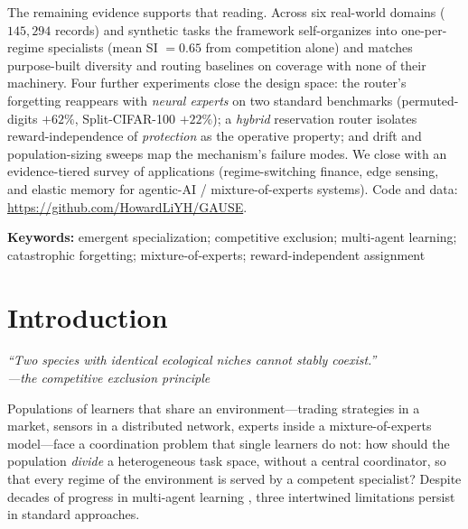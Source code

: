 \documentclass[10pt]{article}
\begin{document}
\begin{abstractbox}
The remaining evidence supports that reading. Across six real-world domains
($145{,}294$ records) and synthetic tasks the framework self-organizes into
one-per-regime specialists (mean SI $=0.65$ from competition alone) and matches
purpose-built diversity and routing baselines on coverage with none of their
machinery. Four further experiments close the design space: the router's forgetting
reappears with \emph{neural experts} on two standard benchmarks (permuted-digits
$+62\%$, Split-CIFAR-100 $+22\%$); a \emph{hybrid} reservation router isolates
reward-independence of \emph{protection} as the operative property; and drift and
population-sizing sweeps map the mechanism's failure modes. We close with an
evidence-tiered survey of applications (regime-switching finance, edge sensing, and
elastic memory for agentic-AI / mixture-of-experts systems).
Code and data: \url{https://github.com/HowardLiYH/GAUSE}.
\end{abstractbox}

\vspace{0.25cm}
\noindent\textbf{Keywords:} emergent specialization; competitive exclusion;
multi-agent learning; catastrophic forgetting; mixture-of-experts;
reward-independent assignment

\newpage
\tableofcontents
\newpage

\section{Introduction}

\begin{center}
\itshape``Two species with identical ecological niches cannot stably coexist.''\\[2pt]
\normalfont ---the competitive exclusion principle \cite{gause1934struggle, hardin1960competitive}
\end{center}

Populations of learners that share an environment---trading strategies in a
market, sensors in a distributed network, experts inside a mixture-of-experts
model---face a coordination problem that single learners do not: how should the
population \emph{divide} a heterogeneous task space, without a central
coordinator, so that every regime of the environment is served by a competent
specialist? Despite decades of progress in multi-agent learning
\cite{zhang2020deep}, three intertwined limitations persist in standard
approaches.
\end{document}
